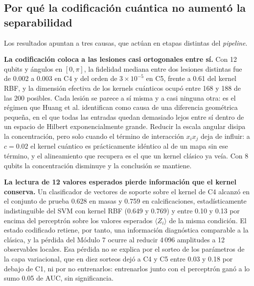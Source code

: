 
\subsection{Por qué la codificación cuántica no aumentó la separabilidad}
\label{sec:causas_separabilidad}

Los resultados apuntan a tres causas, que actúan en etapas distintas del \textit{pipeline}.

\textbf{La codificación coloca a las lesiones casi ortogonales entre sí.} Con 12 qubits y ángulos en
$[0,\pi]$, la fidelidad mediana entre dos lesiones distintas fue de 0.002 a 0.003 en C4 y del orden
de $3 \times 10^{-5}$ en C5, frente a 0.61 del kernel RBF, y la dimensión efectiva de los kernels
cuánticos ocupó entre 168 y 188 de las 200 posibles. Cada lesión se parece a sí misma y a casi ninguna
otra: es el régimen que Huang et al. \cite{huang2021power} identifican como causa de una diferencia
geométrica pequeña, en el que todas las entradas quedan demasiado lejos entre sí dentro de un espacio
de Hilbert exponencialmente grande. Reducir la escala angular disipa la concentración, pero solo cuando
el término de interacción $x_i x_j$ deja de influir: a $c = 0.02$ el kernel cuántico es prácticamente
idéntico al de un mapa sin ese término, y el alineamiento que recupera es el que un kernel clásico ya
veía. Con 8 qubits la concentración disminuye y la conclusión se mantiene.

\textbf{La lectura de 12 valores esperados pierde información que el kernel conserva.} Un clasificador
de vectores de soporte sobre el kernel de C4 alcanzó en el conjunto de prueba 0.628 en masas y 0.759 en
calcificaciones, estadísticamente indistinguible del SVM con kernel RBF (0.649 y 0.769) y entre 0.10 y
0.13 por encima del perceptrón sobre los valores esperados $\langle Z_i\rangle$ de la misma condición.
El estado codificado retiene, por tanto, una información diagnóstica comparable a la clásica, y la
pérdida del Módulo 7 ocurre al reducir 4\,096 amplitudes a 12 observables locales. Esa pérdida no se
explica por el sorteo de los parámetros de la capa variacional, que en diez sorteos dejó a C4 y C5
entre 0.03 y 0.18 por debajo de C1, ni por no entrenarlos: entrenarlos junto con el perceptrón ganó a lo
sumo 0.05 de AUC, sin significancia.


